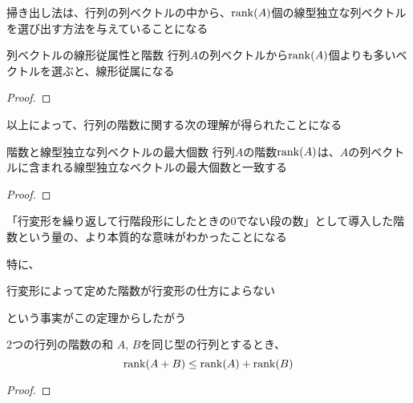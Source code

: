 \documentclass[../../../topic_linear-algebra]{subfiles}
\begin{document}
\br

掃き出し法は、行列の列ベクトルの中から、$\rank(A)$個の線型独立な列ベクトルを選び出す方法を与えていることになる

\begin{theorem}{列ベクトルの線形従属性と階数}
  行列$A$の列ベクトルから$\rank(A)$個よりも多いベクトルを選ぶと、線形従属になる
\end{theorem}

\begin{proof}
\end{proof}

\br

以上によって、行列の階数に関する次の理解が得られたことになる

\begin{theorem}{階数と線型独立な列ベクトルの最大個数}\label{thm:rank-equals-max-indep-cols}
  行列$A$の階数$\rank(A)$は、$A$の列ベクトルに含まれる線型独立なベクトルの最大個数と一致する
\end{theorem}

\begin{proof}
\end{proof}

「行変形を繰り返して行階段形にしたときの0でない段の数」として導入した階数という量の、より本質的な意味がわかったことになる

\br

特に、
\begin{shaded}
  行変形によって定めた階数が行変形の仕方によらない
\end{shaded}
という事実がこの定理からしたがう

\sectionline

\begin{theorem}{2つの行列の階数の和}
  $A,\,B$を同じ型の行列とするとき、
  \begin{equation*}
    \rank(A+B) \leq \rank(A) + \rank(B)
  \end{equation*}
\end{theorem}

\begin{proof}
\end{proof}
\end{document}
